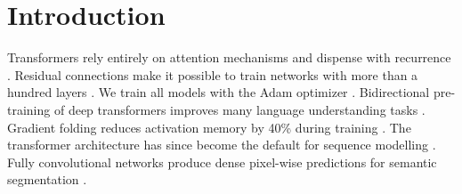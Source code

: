 \documentclass{article}
\begin{document}
\section{Introduction}
Transformers rely entirely on attention mechanisms and dispense with recurrence \citep{vaswani2017attention}.
Residual connections make it possible to train networks with more than a hundred layers \citep{he2016resnet}.
We train all models with the Adam optimizer \citep{kingma2014adam}.
Bidirectional pre-training of deep transformers improves many language understanding tasks \citep{devlin2019bert}.
Gradient folding reduces activation memory by 40\% during training \citep{chen2023gradfold}.
The transformer architecture has since become the default for sequence modelling \citep{vaswani2017transformer, devlin2019bert}.
Fully convolutional networks produce dense pixel-wise predictions for semantic segmentation \citep{hochreiter1997lstm}.


\end{document}
